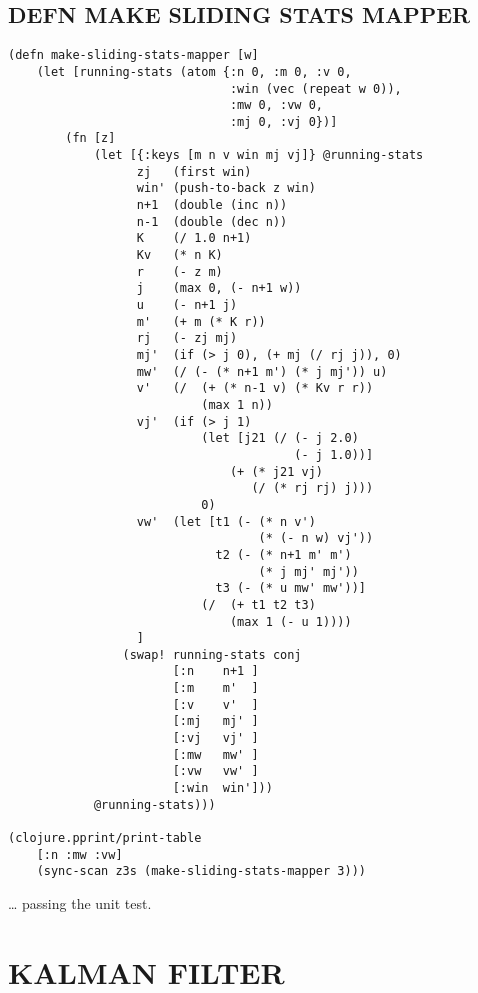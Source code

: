 \documentclass[10pt,oneside,x11names]{article}
\begin{document}
\subsection{DEFN MAKE SLIDING STATS MAPPER}
\label{sec:org48d19fe}

\begin{verbatim}
(defn make-sliding-stats-mapper [w]
    (let [running-stats (atom {:n 0, :m 0, :v 0,
                               :win (vec (repeat w 0)),
                               :mw 0, :vw 0,
                               :mj 0, :vj 0})]
        (fn [z]
            (let [{:keys [m n v win mj vj]} @running-stats
                  zj   (first win)
                  win' (push-to-back z win)
                  n+1  (double (inc n))
                  n-1  (double (dec n))
                  K    (/ 1.0 n+1)
                  Kv   (* n K)
                  r    (- z m)
                  j    (max 0, (- n+1 w))
                  u    (- n+1 j)
                  m'   (+ m (* K r))
                  rj   (- zj mj)
                  mj'  (if (> j 0), (+ mj (/ rj j)), 0)
                  mw'  (/ (- (* n+1 m') (* j mj')) u)
                  v'   (/  (+ (* n-1 v) (* Kv r r))
                           (max 1 n))
                  vj'  (if (> j 1)
                           (let [j21 (/ (- j 2.0)
                                        (- j 1.0))]
                               (+ (* j21 vj)
                                  (/ (* rj rj) j)))
                           0)
                  vw'  (let [t1 (- (* n v')
                                   (* (- n w) vj'))
                             t2 (- (* n+1 m' m')
                                   (* j mj' mj'))
                             t3 (- (* u mw' mw'))]
                           (/  (+ t1 t2 t3)
                               (max 1 (- u 1))))
                  ]
                (swap! running-stats conj
                       [:n    n+1 ]
                       [:m    m'  ]
                       [:v    v'  ]
                       [:mj   mj' ]
                       [:vj   vj' ]
                       [:mw   mw' ]
                       [:vw   vw' ]
                       [:win  win']))
            @running-stats)))

(clojure.pprint/print-table
    [:n :mw :vw]
    (sync-scan z3s (make-sliding-stats-mapper 3)))
\end{verbatim}

\ldots{}  passing the unit test.

\section{KALMAN FILTER}
\label{kalman-filter}
\end{document}
